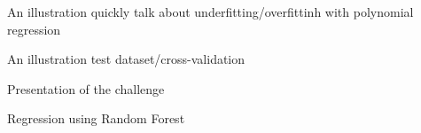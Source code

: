 \documentclass[handout]{beamer}
\begin{document}
\begin{frame}{An illustration}
  quickly talk about underfitting/overfittinh with polynomial regression
\end{frame}

\begin{frame}{An illustration}
  test dataset/cross-validation
\end{frame}

\begin{frame}{Presentation of the challenge}
\end{frame}

\begin{frame}{Regression using Random Forest}
    
\end{frame}

\end{document}

